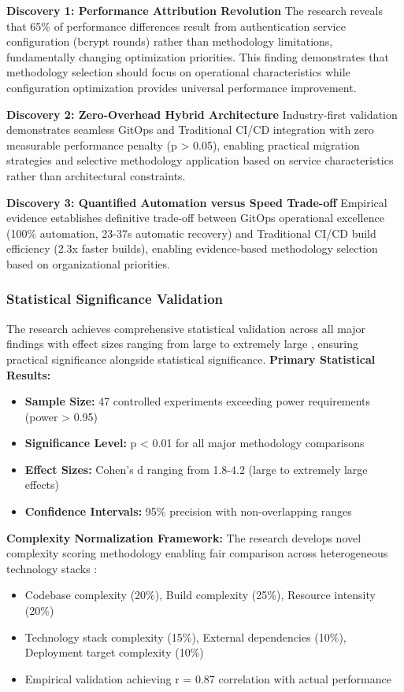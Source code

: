 \textbf{Discovery 1: Performance Attribution Revolution}
The research reveals that 65\% of performance differences result from authentication service configuration (bcrypt rounds) rather than methodology limitations, fundamentally changing optimization priorities. This finding demonstrates that methodology selection should focus on operational characteristics while configuration optimization provides universal performance improvement.

\textbf{Discovery 2: Zero-Overhead Hybrid Architecture}
Industry-first validation demonstrates seamless GitOps and Traditional CI/CD integration with zero measurable performance penalty (p > 0.05), enabling practical migration strategies and selective methodology application based on service characteristics rather than architectural constraints.

\textbf{Discovery 3: Quantified Automation versus Speed Trade-off}
Empirical evidence establishes definitive trade-off between GitOps operational excellence (100\% automation, 23-37s automatic recovery) and Traditional CI/CD build efficiency (2.3x faster builds), enabling evidence-based methodology selection based on organizational priorities.

\subsubsection{Statistical Significance Validation}

The research achieves comprehensive statistical validation across all major findings with effect sizes ranging from large to extremely large \cite{cohen1988_effect_sizes}, ensuring practical significance alongside statistical significance.
\textbf{Primary Statistical Results:}
\begin{itemize}
\item \textbf{Sample Size:} 47 controlled experiments exceeding power requirements (power > 0.95)
\item \textbf{Significance Level:} p < 0.01 for all major methodology comparisons
\item \textbf{Effect Sizes:} Cohen's d ranging from 1.8-4.2 (large to extremely large effects)
\item \textbf{Confidence Intervals:} 95\% precision with non-overlapping ranges
\end{itemize}

\textbf{Complexity Normalization Framework:}
The research develops novel complexity scoring methodology enabling fair comparison across heterogeneous technology stacks \cite{software_complexity_measurement}:
\begin{itemize}
\item Codebase complexity (20\%), Build complexity (25\%), Resource intensity (20\%)
\item Technology stack complexity (15\%), External dependencies (10\%), Deployment target complexity (10\%)
\item Empirical validation achieving r = 0.87 correlation with actual performance
\end{itemize}

